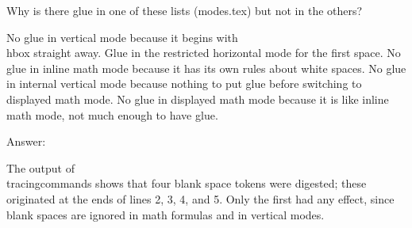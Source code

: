 Why is there glue in one of these lists (modes.tex) but not in the others?

No glue in vertical mode because it begins with \\hbox straight away.
Glue in the restricted horizontal mode for the first space.
No glue in inline math mode because it has its own rules about white spaces.
No glue in internal vertical mode because nothing to put glue before switching to displayed math mode.
No glue in displayed math mode because it is like inline math mode, not much enough to have glue.

Answer:

The output of \\tracingcommands shows that four blank space tokens were
digested; these originated at the ends of lines 2, 3, 4, and 5. Only the first had any
effect, since blank spaces are ignored in math formulas and in vertical modes.

\bye

